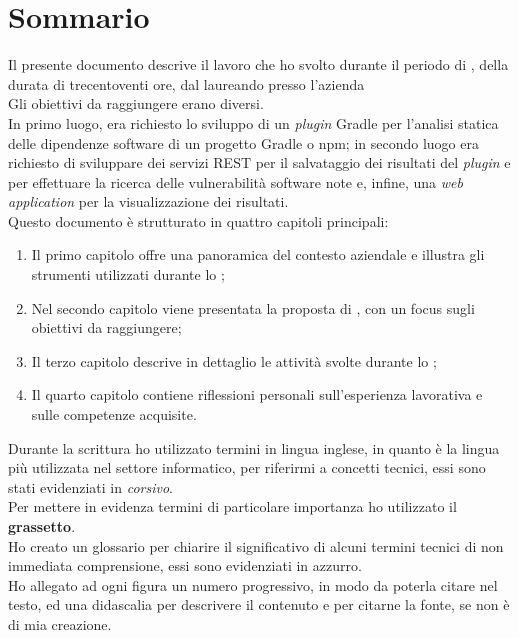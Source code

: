 \cleardoublepage
{}
{}
\begingroup
\let\clearpage\relax
\let\cleardoublepage\relax
\let\cleardoublepage\relax

\chapter*{Sommario}

Il presente documento descrive il lavoro che ho svolto durante il periodo di \stage, della durata di trecentoventi ore, 
dal laureando {\myName} presso l'azienda {\azienda} \\
Gli obiettivi da raggiungere erano diversi.\\
In primo luogo, era richiesto lo sviluppo di un \textit{plugin} Gradle per l'analisi statica delle dipendenze software di un progetto Gradle o npm;
in secondo luogo era richiesto di sviluppare dei servizi REST per il salvataggio dei risultati del \textit{plugin} e per effettuare la ricerca
delle vulnerabilità software note e, infine,
una \textit{web application} per la visualizzazione dei risultati.\\
Questo documento è strutturato in quattro capitoli principali:
\begin{enumerate}
    \item Il primo capitolo offre una panoramica del contesto aziendale e illustra gli strumenti utilizzati durante lo \stage;
    \item Nel secondo capitolo viene presentata la proposta di \stage, con un focus sugli obiettivi da raggiungere;
    \item Il terzo capitolo descrive in dettaglio le attività svolte durante lo \stage;
    \item Il quarto capitolo contiene riflessioni personali sull'esperienza lavorativa e sulle competenze acquisite.
\end{enumerate}

\noindent Durante la scrittura ho utilizzato termini in lingua inglese, in quanto è la lingua più utilizzata nel settore informatico, 
per riferirmi a concetti tecnici, essi sono stati evidenziati in \textit{corsivo}.\\
Per mettere in evidenza termini di particolare importanza ho utilizzato il \textbf{grassetto}.\\
Ho creato un glossario per chiarire il significativo di alcuni termini tecnici di non immediata comprensione, essi sono evidenziati in azzurro.\\
Ho allegato ad ogni figura un numero progressivo, in modo da poterla citare nel testo, ed una didascalia per descrivere il contenuto
e per citarne la fonte, se non è di mia creazione.\\





\endgroup

\vfill
